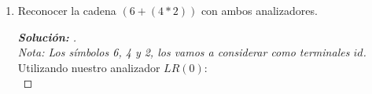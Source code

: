 \documentclass{article}
\begin{document}
\begin{enumerate}
\begin{enumerate}
\begin{proof}[\textbf{Solución: }]
        Finalmente, podemos ver que la gramática proporcionada es también $SLR(1)$ pues se logró generar la tabla de análisis sintáctica de manera correcta sin conflictos. \\
        \end{proof}
        
        \item Reconocer la cadena $(6 + (4 * 2))$ con ambos analizadores.
        \begin{proof}[\textbf{Solución: }]
            \quad \\

            \textit{Nota: Los símbolos 6, 4 y 2, los vamos a considerar como terminales $id$.}\\
            
            Utilizando nuestro analizador $LR(0)$: \\


\end{proof}
\end{enumerate}
\end{enumerate}
\end{document}
